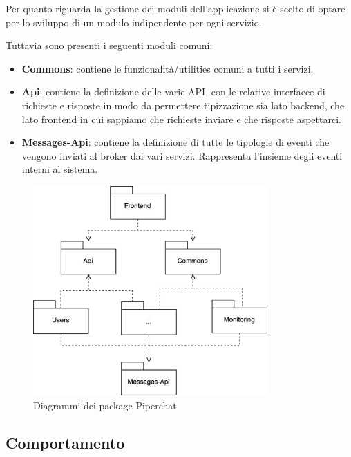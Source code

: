 Per quanto riguarda la gestione dei moduli dell'applicazione si è scelto di optare per lo sviluppo di un modulo indipendente per ogni servizio.

Tuttavia sono presenti i seguenti moduli comuni:

\begin{itemize}
    \item \textbf{Commons}: contiene le funzionalità/utilities comuni a tutti i servizi.

    \item \textbf{Api}: contiene la definizione delle varie API, con le relative interfacce di richieste e risposte in modo da permettere tipizzazione sia lato backend, che lato frontend in cui sappiamo che richieste inviare e che risposte aspettarci.

    \item \textbf{Messages-Api}: contiene la definizione di tutte le tipologie di eventi che vengono inviati al broker dai vari servizi. Rappresenta l'insieme degli eventi interni al sistema.
\end{itemize}

\begin{figure}[H]
    \centering
    \includegraphics[width=0.8\textwidth]{sections/03-design/img/piperchat-Modules.jpg}
    \caption{Diagrammi dei package Piperchat}
    \label{fig:piperchat-modules}
\end{figure}

%
%
%
\subsection{Comportamento}

